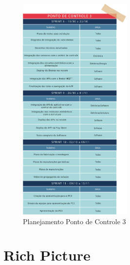 \begin{apendicesenv}
\begin{figure}[H]
    \centering
    \includegraphics[width=0.5\textwidth]{figuras/sprint-pc3.png}
    \caption{Planejamento Ponto de Controle 3}
    \label{fig:Sprint_pc3}
\end{figure}

\chapter{Rich Picture}
\label{richpiture_software}


\end{apendicesenv}
